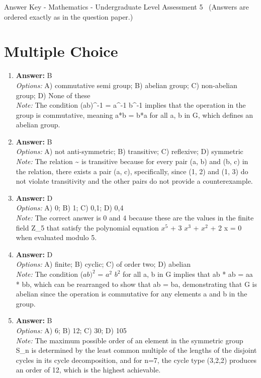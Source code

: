 \documentclass[12pt]{article}
\begin{document}
\begin{center}
Answer Key - Mathematics - Undergraduate Level Assessment 5 \
\small (Answers are ordered exactly as in the question paper.)
\end{center}

\section*{Multiple Choice}
\begin{enumerate}[label=\arabic*.]
\item \textbf{Answer:} B
\\ \textit{Options:} A) commutative semi group; B) abelian group; C) non-abelian group; D) None of these
\\ \textit{Note:} The condition (ab)^-1 = a^-1 b^-1 implies that the operation in the group is commutative, meaning a*b = b*a for all a, b in G, which defines an abelian group.
\item \textbf{Answer:} B
\\ \textit{Options:} A) not anti-symmetric; B) transitive; C) reflexive; D) symmetric
\\ \textit{Note:} The relation \textasciitilde{} is transitive because for every pair (a, b) and (b, c) in the relation, there exists a pair (a, c), specifically, since (1, 2) and (1, 3) do not violate transitivity and the other pairs do not provide a counterexample.
\item \textbf{Answer:} D
\\ \textit{Options:} A) 0; B) 1; C) 0,1; D) 0,4
\\ \textit{Note:} The correct answer is 0 and 4 because these are the values in the finite field Z\_5 that satisfy the polynomial equation $x^5$ + 3 $x^3$ + $x^2$ + 2 x = 0 when evaluated modulo 5.
\item \textbf{Answer:} D
\\ \textit{Options:} A) finite; B) cyclic; C) of order two; D) abelian
\\ \textit{Note:} The condition ($ab)^2$ = $a^2$ $b^2$ for all a, b in G implies that ab * ab = aa * bb, which can be rearranged to show that ab = ba, demonstrating that G is abelian since the operation is commutative for any elements a and b in the group.
\item \textbf{Answer:} B
\\ \textit{Options:} A) 6; B) 12; C) 30; D) 105
\\ \textit{Note:} The maximum possible order of an element in the symmetric group S\_n is determined by the least common multiple of the lengths of the disjoint cycles in its cycle decomposition, and for n=7, the cycle type (3,2,2) produces an order of 12, which is the highest achievable.
\end{enumerate}
\end{document}
